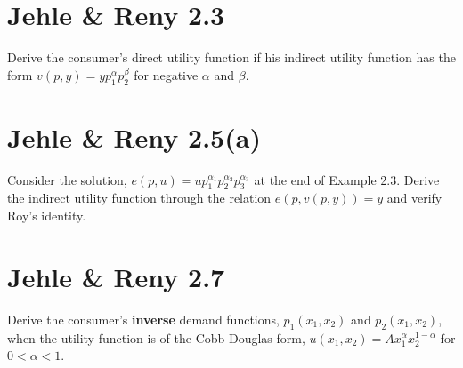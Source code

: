 \documentclass{article}
\begin{document}
\begin{landscape}
{
}
\end{landscape}

\section{Jehle \& Reny 2.3}
Derive the consumer’s direct utility function if his indirect utility function has the form $v(p, y) =
yp_1^\alpha p_2^\beta$ for negative $\alpha$ and $\beta$.



\section{Jehle \& Reny 2.5(a)}
Consider the solution, $e(p, u) = up_1^{\alpha_1}p_2^{\alpha_2}p_3^{\alpha_3}$ at the end of Example 2.3.
Derive the indirect utility function through the relation $e(p, v(p, y)) = y$ and verify Roy's
identity.

\section{Jehle \& Reny 2.7}
Derive the consumer's \textbf{inverse} demand functions, $p_1(x_1, x_2)$ and $p_2(x_1, x_2)$, 
when the utility function is of the Cobb-Douglas form, $u(x_1, x_2) = Ax_1^{\alpha}x_2^{1-\alpha}$
for $0 < \alpha < 1$.
\end{document}
